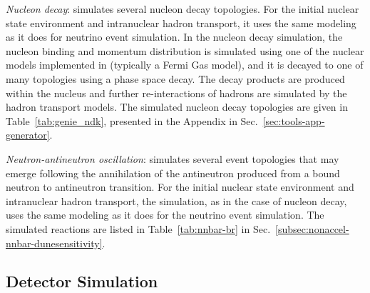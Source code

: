 \textit{Nucleon decay}:  simulates several nucleon decay topologies. For the initial nuclear state environment and intranuclear hadron transport, it uses the same modeling as it does for neutrino event simulation. In the nucleon decay simulation, the nucleon binding and momentum distribution is simulated using one of the nuclear models implemented in  (typically a Fermi Gas model), and it is decayed to one of many topologies using a phase space decay. The decay products are produced within the nucleus and further re-interactions of hadrons are simulated by the  hadron transport models. The simulated nucleon decay topologies are given in Table~\ref{tab:genie_ndk}, presented in the Appendix
in Sec.~\ref{sec:tools-app-generator}.

\textit{Neutron-antineutron oscillation}:  simulates several event topologies that may emerge following the annihilation of the antineutron produced from a bound neutron to antineutron transition. For the initial nuclear state environment and intranuclear hadron transport, the simulation, as in the case of nucleon decay, uses the same modeling as it does for the neutrino event simulation. The simulated reactions are listed in Table~\ref{tab:nnbar-br} in 
Sec.~\ref{subsec:nonaccel-nnbar-dunesensitivity}.


\subsection{Detector Simulation}
\label{sec:tools-mc-detsim}



